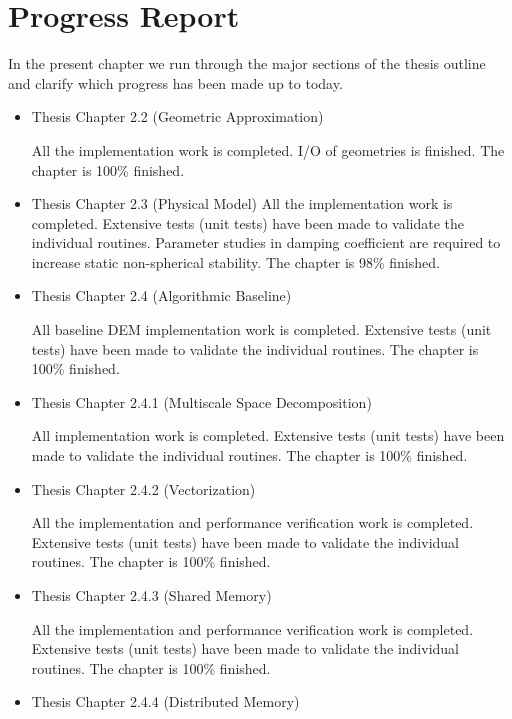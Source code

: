 \documentclass[times,12pt]{article}
\begin{document}
\clearpage
\section{Progress Report}

In the present chapter we run through the major sections of the thesis outline and clarify which progress has been made up to today.

\vspace{5mm}
\begin{itemize}
\item Thesis Chapter 2.2 (Geometric Approximation)

All the implementation work is completed. I/O of geometries is finished. The chapter is 100\% finished.

\item Thesis Chapter 2.3 (Physical Model)
All the implementation work is completed. Extensive tests (unit tests) have been made to validate the individual routines. Parameter studies in damping coefficient are required to increase static non-spherical stability. The chapter is 98\% finished.

\item Thesis Chapter 2.4 (Algorithmic Baseline)

All baseline DEM implementation work is completed. Extensive tests (unit tests) have been made to validate the individual routines. The chapter is 100\% finished.

\item Thesis Chapter 2.4.1 (Multiscale Space Decomposition)

All implementation work is completed. Extensive tests (unit tests) have been made to validate the individual routines. The chapter is 100\% finished.

\item Thesis Chapter 2.4.2 (Vectorization)

All the implementation and performance verification work is completed. Extensive tests (unit tests) have been made to validate the individual routines. The chapter is 100\% finished.

\item Thesis Chapter 2.4.3 (Shared Memory)

All the implementation and performance verification work is completed. Extensive tests (unit tests) have been made to validate the individual routines. The chapter is 100\% finished. 

\item Thesis Chapter 2.4.4 (Distributed Memory)


\end{itemize}
\end{document}
